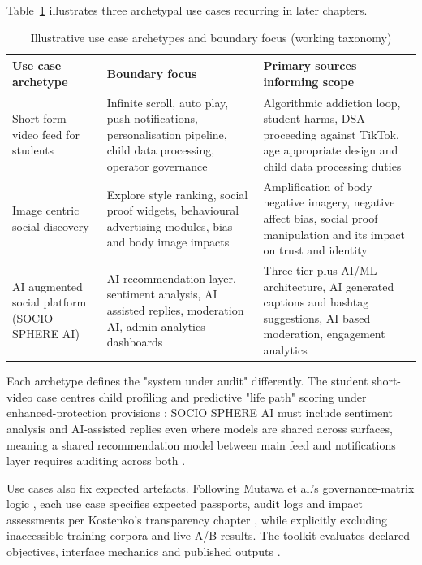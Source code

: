 \documentclass[11pt]{article}
\begin{document}
Table~\ref{tab:use_cases_scope} illustrates three archetypal use cases recurring in later chapters. \begin{table}[H] \centering \caption{Illustrative use case archetypes and boundary focus (working taxonomy)} \label{tab:use_cases_scope} \begin{tabular}{p{3.2cm}p{4.4cm}p{4.4cm}} \hline Use case archetype & Boundary focus & Primary sources informing scope \\ \hline Short form video feed for students & Infinite scroll, auto play, push notifications, personalisation pipeline, child data processing, operator governance & Algorithmic addiction loop, student harms, DSA proceeding against TikTok, age appropriate design and child data processing duties \parencites[2]{8958037}[6]{8958037}[2]{3303310}[20]{2977039} \\ Image centric social discovery & Explore style ranking, social proof widgets, behavioural advertising modules, bias and body image impacts & Amplification of body negative imagery, negative affect bias, social proof manipulation and its impact on trust and identity \parencites[3]{3303310}[13]{7160486} \\ AI augmented social platform (SOCIO SPHERE AI) & AI recommendation layer, sentiment analysis, AI assisted replies, moderation AI, admin analytics dashboards & Three tier plus AI/ML architecture, AI generated captions and hashtag suggestions, AI based moderation, engagement analytics \parencites{3413731} \\ \hline \end{tabular} \end{table} Each archetype defines the "system under audit" differently. The student short-video case centres child profiling and predictive "life path" scoring under enhanced-protection provisions \parencites[20]{2977039}[62]{2977039}; SOCIO SPHERE AI must include sentiment analysis and AI-assisted replies even where models are shared across surfaces, meaning a shared recommendation model between main feed and notifications layer requires auditing across both \parencites{3413731}.

Use cases also fix expected artefacts. Following Mutawa et al.'s governance-matrix logic \parencites{2702055}, each use case specifies expected passports, audit logs and impact assessments per Kostenko's transparency chapter \parencites[68]{2977039}[69]{2977039}, while explicitly excluding inaccessible training corpora and live A/B results. The toolkit evaluates declared objectives, interface mechanics and published outputs \parencites[68]{2977039}[21]{3195574}[2]{0375818}.
\end{document}
